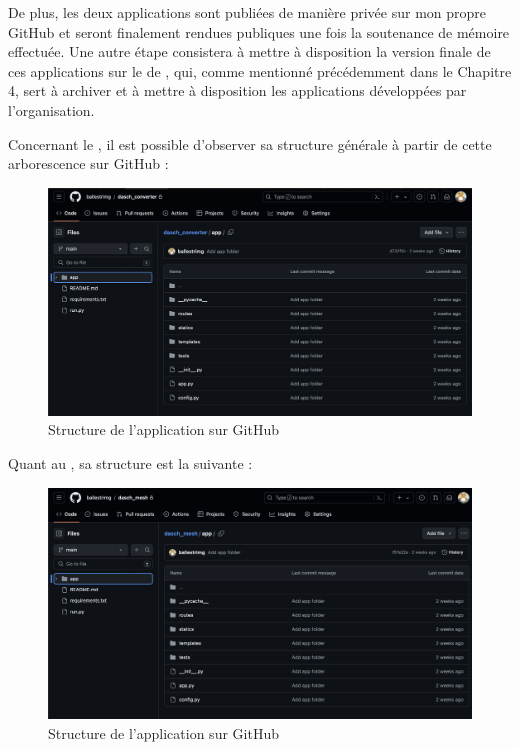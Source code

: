     De plus, les deux applications sont publiées de manière privée sur mon propre GitHub et seront finalement rendues publiques une fois la soutenance de mémoire effectuée. Une autre étape consistera à mettre à disposition la version finale de ces applications sur le  de \dsc, qui, comme mentionné précédemment dans le Chapitre 4, sert à archiver et à mettre à disposition les applications développées par l'organisation.

    Concernant le \cvt, il est possible d'observer sa structure générale à partir de cette arborescence sur GitHub :

        \begin{figure}[h!]
            \centering
            \includegraphics[width=12cm]{02_images/part_02/03_app_dasch_conv_github.png}
            \caption{Structure de l'application \cvt sur GitHub}
        \end{figure}

    Quant au \msh, sa structure est la suivante : 

        \begin{figure}[h!]
            \centering
            \includegraphics[width=12cm]{02_images/part_02/04_app_dasch_mesh_github.png}
            \caption{Structure de l'application \msh sur GitHub}
        \end{figure}

